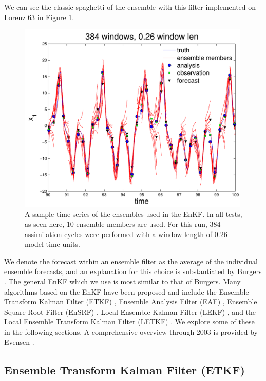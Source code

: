 \documentclass[12pt]{report}
\begin{document}
We can see the classic spaghetti of the ensemble with this filter implemented on Lorenz 63 in Figure \ref{fig:spaghetti}.

\begin{figure}[h!]
  \centering
  \includegraphics[width=0.99\textwidth]{figures/EnKF_spaghetti.pdf}
  \caption[A sample time-series of the ensembles used in the EnKF]{
    A sample time-series of the ensembles used in the EnKF.
    In all tests, as seen here, 10 ensemble members are used.
    For this run, 384 assimilation cycles were performed with a window length of 0.26 model time units.
  }
  \label{fig:spaghetti}
\end{figure}

We denote the forecast within an ensemble filter as the average of the individual ensemble forecasts, and an explanation for this choice is substantiated by Burgers .
The general EnKF which we use is most similar to that of Burgers.
Many algorithms based on the EnKF have been proposed and include the Ensemble Transform Kalman Filter (ETKF) , Ensemble Analysis Filter (EAF) , Ensemble Square Root Filter (EnSRF) , Local Ensemble Kalman Filter (LEKF) , and the Local Ensemble Transform Kalman Filter (LETKF) .
We explore some of these in the following sections.
A comprehensive overview through 2003 is provided by Evensen .

\subsection{Ensemble Transform Kalman Filter (ETKF)}
\end{document}
